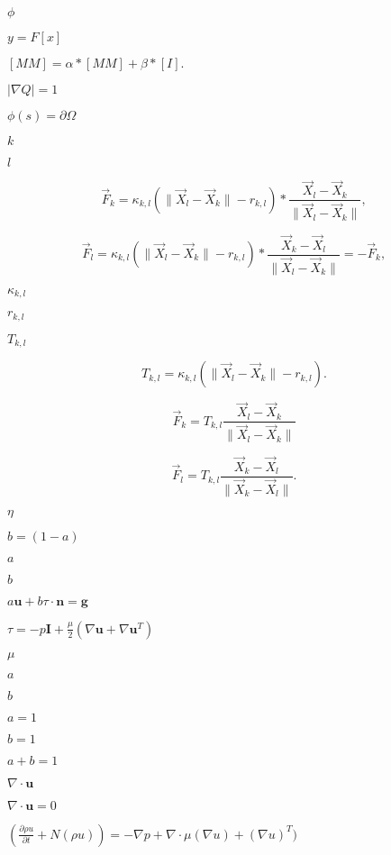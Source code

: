 \documentclass{article}
\begin{document}
$ \phi $
\pagebreak

$y=F[x]$
\pagebreak

$ [MM] = \alpha*[MM] + \beta*[I]. $
\pagebreak

$ |\nabla Q | = 1 $
\pagebreak

$ \phi(s) = \partial \Omega $
\pagebreak

$ k $
\pagebreak

$ l $
\pagebreak

\[ \vec{F}_k = \kappa_{k,l} \left( \|\vec{X}_{l} - \vec{X}_{k}\| - r_{k,l} \right) *\frac{\vec{X}_{l} - \vec{X}_{k}}{\|\vec{X}_{l} - \vec{X}_{k}\|}, \]
\pagebreak

\[ \vec{F}_l = \kappa_{k,l} \left( \|\vec{X}_{l} - \vec{X}_{k}\| - r_{k,l} \right) *\frac{\vec{X}_{k} - \vec{X}_{l}}{\|\vec{X}_{l} - \vec{X}_{k}\|} = - \vec{F}_k, \]
\pagebreak

$ \kappa_{k,l} $
\pagebreak

$ r_{k,l} $
\pagebreak

$ T_{k,l} $
\pagebreak

\[ T_{k,l} = \kappa_{k,l} \left( \|\vec{X}_{l} - \vec{X}_{k}\| - r_{k,l} \right). \]
\pagebreak

\[ \vec{F}_k = T_{k,l} \frac{\vec{X}_{l} - \vec{X}_{k}}{\|\vec{X}_{l} - \vec{X}_{k}\|} \]
\pagebreak

\[ \vec{F}_l = T_{k,l} \frac{\vec{X}_{k} - \vec{X}_{l}}{\|\vec{X}_{k} - \vec{X}_{l}\|}. \]
\pagebreak

$ \eta $
\pagebreak

$ b = (1-a) $
\pagebreak

$a$
\pagebreak

$b$
\pagebreak

$ a\mathbf{u} + b\tau\cdot\mathbf{n} = \mathbf{g}$
\pagebreak

$\tau = -p\mathbf{I} + \frac{\mu}{2}\left(\nabla\mathbf{u} + \nabla\mathbf{u}^T\right)$
\pagebreak

$\mu$
\pagebreak

$ a$
\pagebreak

$ b $
\pagebreak

$ a = 1 $
\pagebreak

$b = 1$
\pagebreak

$a + b = 1$
\pagebreak

$ \nabla \cdot \mathbf{u} $
\pagebreak

$ \nabla \cdot \mathbf{u} = 0 $
\pagebreak

$(\frac{\partial \rho u}{\partial t} + N(\rho u)) = -\nabla p + \nabla \cdot \mu (\nabla u) + (\nabla u)^T )$
\pagebreak
\end{document}
